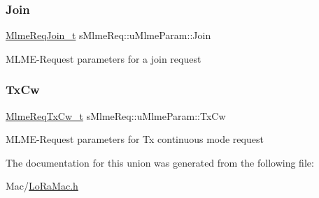 \subsubsection{\texorpdfstring{Join}{Join}}
{\footnotesize\ttfamily \hyperlink{group__LORAMAC_gab12f7f7d9bdfb8067d56f7c9f1297d95}{Mlme\+Req\+Join\+\_\+t} s\+Mlme\+Req\+::u\+Mlme\+Param\+::\+Join}

M\+L\+M\+E-\/\+Request parameters for a join request \mbox{\label{unionsMlmeReq_1_1uMlmeParam_a574dc0aa0d991726f55da055105c5dcf}} 
\subsubsection{\texorpdfstring{Tx\+Cw}{TxCw}}
{\footnotesize\ttfamily \hyperlink{group__LORAMAC_gab71a9931686ff623fa01ceecc61f1986}{Mlme\+Req\+Tx\+Cw\+\_\+t} s\+Mlme\+Req\+::u\+Mlme\+Param\+::\+Tx\+Cw}

M\+L\+M\+E-\/\+Request parameters for Tx continuous mode request 

The documentation for this union was generated from the following file\+:\begin{DoxyCompactItemize}
\item 
Mac/\hyperlink{LoRaMac_8h}{Lo\+Ra\+Mac.\+h}\end{DoxyCompactItemize}
